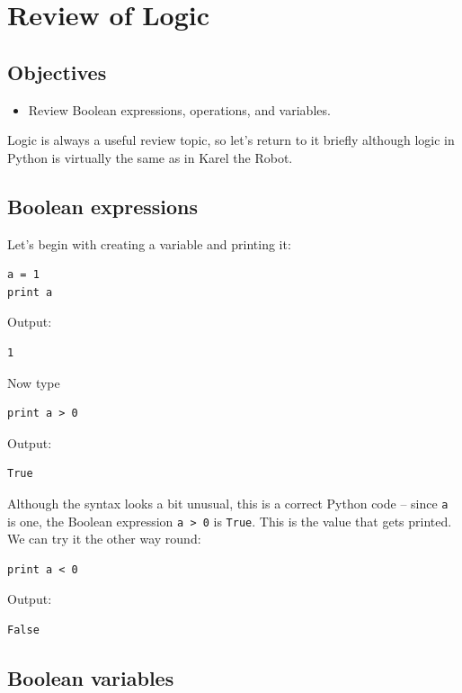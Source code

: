 \section{Review of Logic}

\subsection{Objectives}

\begin{itemize}
\item Review Boolean expressions, operations, and variables.
\end{itemize}
Logic is always a useful review topic, so let's return to it briefly although logic in Python is 
virtually the same as in Karel the Robot.

\subsection{Boolean expressions}

Let's begin with creating a variable 
and printing it:

\begin{verbatim}
a = 1
print a
\end{verbatim}
Output:

\begin{verbatim}
1
\end{verbatim}
Now type

\begin{verbatim}
print a > 0
\end{verbatim}
Output:

\begin{verbatim}
True
\end{verbatim}
Although the syntax looks a bit unusual, this is a correct
Python code -- since {\tt a} is one, the Boolean expression {\tt a > 0}
is {\tt True}. This is the value that gets printed. We can try it the other 
way round:

\begin{verbatim}
print a < 0
\end{verbatim}
Output:

\begin{verbatim}
False
\end{verbatim}

\subsection{Boolean variables}

